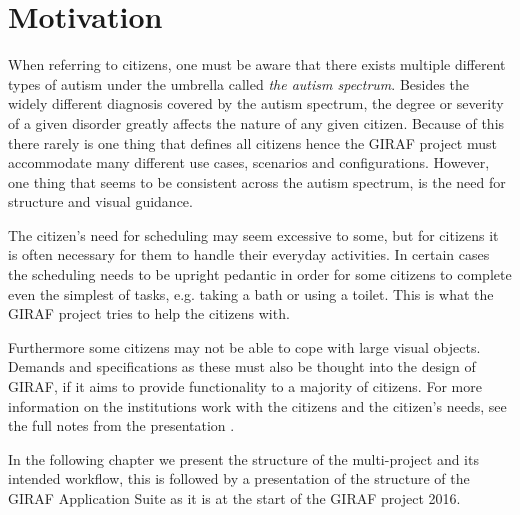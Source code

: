 \section{Motivation}
When referring to citizens, one must be aware that there exists multiple different types of autism under the umbrella called \textit{the autism spectrum}.
Besides the widely different diagnosis covered by the autism spectrum, the degree or severity of a given disorder greatly affects the nature of any given citizen.
Because of this there rarely is one thing that defines all citizens hence the GIRAF project must accommodate many different use cases, scenarios and configurations.
However, one thing that seems to be consistent across the autism spectrum, is the need for structure and visual guidance.

The citizen's need for scheduling may seem excessive to some, but for citizens it is often necessary for them to handle their everyday activities.
In certain cases the scheduling needs to be upright pedantic in order for some citizens to complete even the simplest of tasks, e.g. taking a bath or using a toilet.
This is what the GIRAF project tries to help the citizens with.

Furthermore some citizens may not be able to cope with large visual objects.
Demands and specifications as these must also be thought into the design of GIRAF, if it aims to provide functionality to a majority of citizens.
For more information on the institutions work with the citizens and the citizen's needs, see the full notes from the presentation \cite{GIRAF20161stMeeting}.

In the following chapter we present the structure of the multi-project and its intended workflow, this is followed by a presentation of the structure of the GIRAF Application Suite as it is at the start of the GIRAF project 2016.
